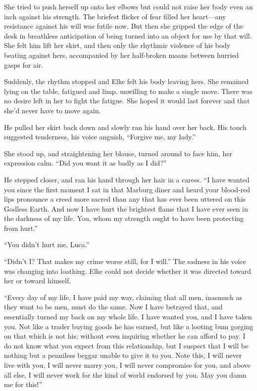 She tried to push herself up onto her elbows but could not raise her body even an inch against his strength. The briefest flicker of fear filled her heart---any resistance against his will was futile now. But then she gripped the edge of the desk in breathless anticipation of being turned into an object for use by that will. She felt him lift her skirt, and then only the rhythmic violence of his body beating against hers, accompanied by her half-broken moans between hurried gasps for air.

Suddenly, the rhythm stopped and Elke felt his body leaving hers. She remained lying on the table, fatigued and limp, unwilling to make a single move. There was no desire left in her to fight the fatigue. She hoped it would last forever and that she'd never have to move again.

He pulled her skirt back down and slowly ran his hand over her back. His touch suggested tenderness, his voice anguish, ``Forgive me, my lady.''

She stood up, and straightening her blouse, turned around to face him, her expression calm. ``Did you want it as badly as I did?''

He stepped closer, and ran his hand through her hair in a caress. ``I have wanted you since the first moment I sat in that Marburg diner and heard your blood-red lips pronounce a creed more sacred than any that has ever been uttered on this Godless Earth. And now I have hurt the brightest flame that I have ever seen in the darkness of my life. You, whom my strength ought to have been protecting from hurt.''

``You didn't hurt me, Luca.''

``Didn't I? That makes my crime worse still, for I will.'' The sadness in his voice was changing into loathing. Elke could not decide whether it was directed toward her or toward himself.

``Every day of my life, I have paid my way, claiming that all men, inasmuch as they want to be men, must do the same. Now I have betrayed that, and essentially turned my back on my whole life. I have wanted you, and I have taken you. Not like a trader buying goods he has earned, but like a looting bum gorging on that which is not his; without even inquiring whether he can afford to pay. I do not know what you expect from this relationship, but I suspect that I will be nothing but a penniless beggar unable to give it to you. Note this, I will never live with you, I will never marry you, I will never compromise for you, and above all else, I will never work for the kind of world endorsed by you. May you damn me for this!''

